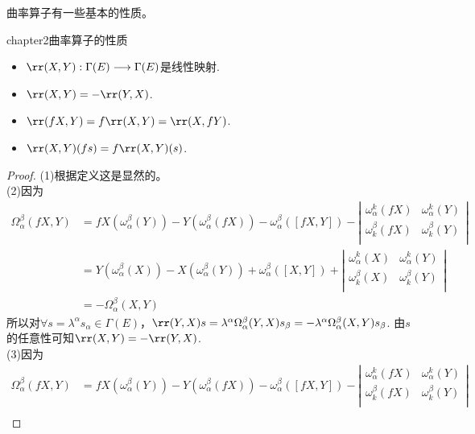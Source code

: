 曲率算子有一些基本的性质。
\begin{mythm}{}{chapter2曲率算子的性质}
	\begin{itemize}
		\item[(1)] $\rr(X,Y):\Gamma(E)\longrightarrow \Gamma(E)$是线性映射.
		\item[(2)] $\rr(X,Y)=-\rr(Y,X)$.
		\item[(3)] $\rr(fX,Y)=f \rr(X,Y)=\rr(X,fY)$.
		\item[(4)] $\rr(X,Y)(fs)=f\rr(X,Y)(s)$.
	\end{itemize}
\end{mythm}
\begin{proof}
	(1)根据定义这是显然的。\\
	(2)因为
	\[
	\begin{split}
	\Omega^{\beta}_{\alpha}(fX,Y)&=fX\left(\omega^{\beta}_{\alpha}(Y) \right)-Y\left(\omega^{\beta}_{\alpha}(fX) \right)-\omega^{\beta}_{\alpha}\left([fX,Y] \right)-\left| \begin{array}{cc}{\omega^{k}_{\alpha}(fX)} & {\omega^{k}_{\alpha}(Y)}\\ {\omega^{\beta}_{k}(fX)} & {\omega^{\beta}_{k}(Y)}\\ \end{array}\right|\\
	&=Y\left(\omega^{\beta}_{\alpha}(X) \right)-X\left(\omega^{\beta}_{\alpha}(Y) \right)+\omega^{\beta}_{\alpha}\left([X,Y] \right)+\left| \begin{array}{cc}{\omega^{k}_{\alpha}(X)} & {\omega^{k}_{\alpha}(Y)}\\ {\omega^{\beta}_{k}(X)} & {\omega^{\beta}_{k}(Y)}\\ \end{array}\right|\\
	&=-\Omega^{\beta}_{\alpha}(X,Y)
	\end{split}
	\]
	所以对$\forall s=\lambda^{\alpha}s_{\alpha}\in \Gamma(E)$，$\rr(Y,X)s=\lambda^{\alpha}\Omega^{\beta}_{\alpha}(Y,X)s_{\beta}=-\lambda^{\alpha}\Omega^{\beta}_{\alpha}(X,Y)s_{\beta}$. 由$s$的任意性可知$\rr(X,Y)=-\rr(Y,X)$.\\
	(3)因为
	\[
	\begin{split}
	\Omega^{\beta}_{\alpha}(fX,Y)&=fX\left(\omega^{\beta}_{\alpha}(Y) \right)-Y\left(\omega^{\beta}_{\alpha}(fX) \right)-\omega^{\beta}_{\alpha}\left([fX,Y] \right)-\left| \begin{array}{cc}{\omega^{k}_{\alpha}(fX)} & {\omega^{k}_{\alpha}(Y)}\\ {\omega^{\beta}_{k}(fX)} & {\omega^{\beta}_{k}(Y)}\\ \end{array}\right|\\

\end{split}\]
\end{proof}
